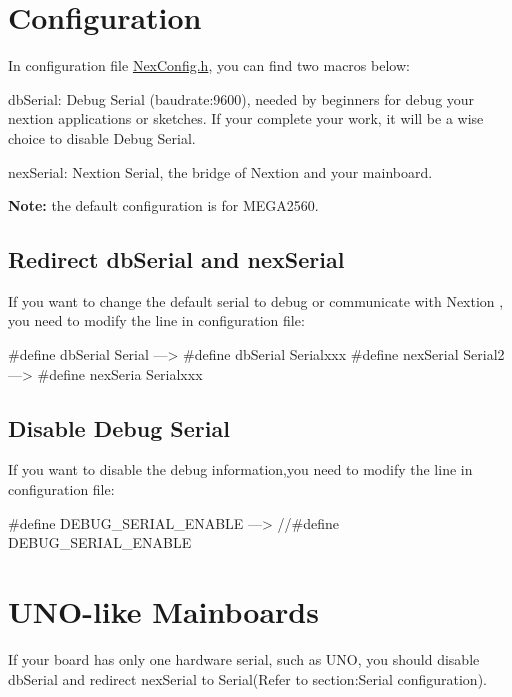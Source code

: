 \section*{Configuration}

In configuration file \hyperlink{_nex_config_8h}{Nex\+Config.\+h}, you can find two macros below\+:


\begin{DoxyItemize}
\item db\+Serial\+: Debug Serial (baudrate\+:9600), needed by beginners for debug your nextion applications or sketches. If your complete your work, it will be a wise choice to disable Debug Serial.
\item nex\+Serial\+: Nextion Serial, the bridge of Nextion and your mainboard.
\end{DoxyItemize}

{\bfseries Note\+:} the default configuration is for M\+E\+G\+A2560.

\subsection*{Redirect db\+Serial and nex\+Serial}

If you want to change the default serial to debug or communicate with Nextion , you need to modify the line in configuration file\+: \begin{DoxyVerb}#define dbSerial Serial    ---> #define dbSerial Serialxxx
#define nexSerial Serial2  ---> #define nexSeria Serialxxx
\end{DoxyVerb}


\subsection*{Disable Debug Serial}

If you want to disable the debug information,you need to modify the line in configuration file\+: \begin{DoxyVerb}#define DEBUG_SERIAL_ENABLE ---> //#define DEBUG_SERIAL_ENABLE
\end{DoxyVerb}


\section*{U\+N\+O-\/like Mainboards}

If your board has only one hardware serial, such as U\+N\+O, you should disable db\+Serial and redirect nex\+Serial to Serial(Refer to section\+:{\ttfamily Serial configuration}).

